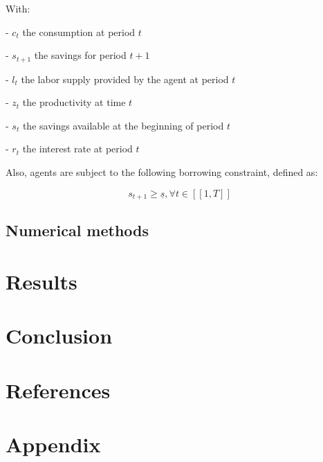 \documentclass{article}
\begin{document}
With: 

-  $c_t$ the consumption at period $t$

-  $s_{t+1}$ the savings for period $t+1$

-  $l_t$ the labor supply provided by the agent at period $t$

-  $z_t$ the productivity at time $t$

-  $s_{t}$ the savings available at the beginning of period $t$

-  $r_{t}$ the interest rate at period $t$

Also, agents are subject to the following borrowing constraint, defined as: 

$$s_{t+1}\geq \underline{s}, \forall t \in [\![1,T]\!]$$

\subsection{Numerical methods}

\section{Results}

\section{Conclusion}

\section{References}

\printbibliography

\section{Appendix}
\end{document}

